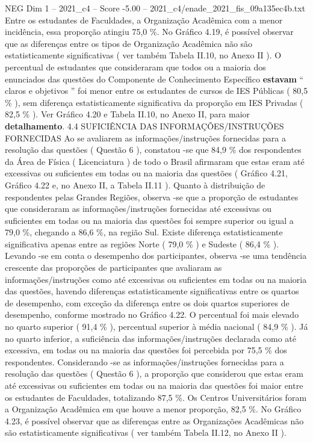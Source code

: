 \begin{textsample}{NEG Dim 1 – 2021\_c4 – Score -5.00 – 2021\_c4/enade\_2021\_fis\_09a135ec4b.txt}
Entre os estudantes de Faculdades, a Organização Acadêmica com a menor incidência, essa proporção atingiu 75,0 \%.
No Gráfico 4.19, é possível observar que as diferenças entre os tipos de Organização Acadêmica não são estatisticamente significativas ( ver também Tabela II.10, no Anexo II ).
O percentual de estudantes que consideraram que todos ou a maioria dos enunciados das questões do Componente de Conhecimento Específico \textbf{estavam} “ claros e objetivos ” foi menor entre os estudantes de cursos de IES Públicas ( 80,5 \% ), sem diferença estatisticamente significativa da proporção em IES Privadas ( 82,5 \% ).
Ver Gráfico 4.20 e Tabela II.10, no Anexo II, para maior \textbf{detalhamento}. 4.4 SUFICIÊNCIA DAS INFORMAÇÕES/INSTRUÇÕES FORNECIDAS Ao se avaliarem as informações/instruções fornecidas para a resolução das questões ( Questão 6 ), constatou -se que 84,9 \% dos respondentes da Área de Física ( Licenciatura ) de todo o Brasil afirmaram que estas eram até excessivas ou suficientes em todas ou na maioria das questões ( Gráfico 4.21, Gráfico 4.22 e, no Anexo II, a Tabela II.11 ).
Quanto à distribuição de respondentes pelas Grandes Regiões, observa -se que a proporção de estudantes que consideraram as informações/instruções fornecidas até excessivas ou suficientes em todas ou na maioria das questões foi sempre superior ou igual a 79,0 \%, chegando a 86,6 \%, na região Sul.
Existe diferença estatisticamente significativa apenas entre as regiões Norte ( 79,0 \% ) e Sudeste ( 86,4 \% ).
Levando -se em conta o desempenho dos participantes, observa -se uma tendência crescente das proporções de participantes que avaliaram as informações/instruções como até excessivas ou suficientes em todas ou na maioria das questões, havendo diferenças estatisticamente significativas entre os quartos de desempenho, com exceção da diferença entre os dois quartos superiores de desempenho, conforme mostrado no Gráfico 4.22.
O percentual foi mais elevado no quarto superior ( 91,4 \% ), percentual superior à média nacional ( 84,9 \% ).
Já no quarto inferior, a suficiência das informações/instruções declarada como até excessiva, em todas ou na maioria das questões foi percebida por 75,5 \% dos respondentes.
Considerando -se as informações/instruções fornecidas para a resolução das questões ( Questão 6 ), a proporção que considerou que estas eram até excessivas ou suficientes em todas ou na maioria das questões foi maior entre os estudantes de Faculdades, totalizando 87,5 \%.
Os Centros Universitários foram a Organização Acadêmica em que houve a menor proporção, 82,5 \%.
No Gráfico 4.23, é possível observar que as diferenças entre as Organizações Acadêmicas não são estatisticamente significativas ( ver também Tabela II.12, no Anexo II ).

\end{textsample}
